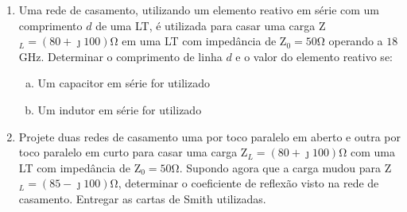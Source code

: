 \begin{enumerate}[1.]
\item Uma rede de casamento, utilizando um elemento reativo em série com um comprimento $d$ de uma LT, é utilizada para casar uma carga Z$_{L} = (80 + \jmath 100)$\si{\ohm} em uma LT com impedância de Z$_{0} = 50$\si{\ohm} operando a $18$\si{\giga\hertz}. Determinar o comprimento de linha $d$ e o valor do elemento reativo se:
\begin{enumerate}[a.]
  \setlength\itemindent{15pt} \item Um capacitor em série for utilizado
  \setlength\itemindent{15pt} \item Um indutor em série for utilizado
\end{enumerate}
\item Projete duas redes de casamento uma por toco paralelo em aberto e outra por toco paralelo em curto para casar uma carga Z$_{L} = (80 + \jmath 100)$\si{\ohm} com uma LT com impedância de Z$_{0} = 50$\si{\ohm}. Supondo agora que a carga mudou para Z$_{L} = (85 - \jmath 100)$\si{\ohm}, determinar o coeficiente de reflexão visto na rede de casamento. Entregar as cartas de Smith utilizadas.
\end{enumerate}

\newpage

